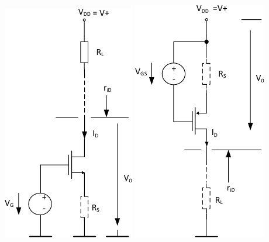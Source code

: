 \begin{minipage}[t]{0.35\columnwidth}
    \includegraphics[width=0.48\columnwidth, align=t]{images/05_stromquelle_einfach_NMOS.pdf}
    \includegraphics[width=0.48\columnwidth, align=t]{images/05_stromquelle_einfach_PMOS.pdf}
\end{minipage}
\hfill
